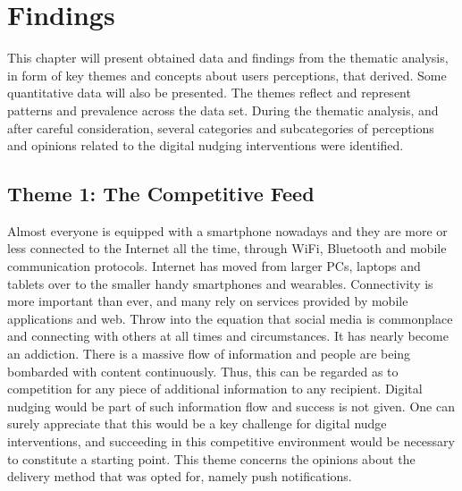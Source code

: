 \chapter{Findings}
This chapter will present obtained data and findings from the thematic analysis, in form of key themes and concepts about users perceptions, that derived. Some quantitative data will also be presented. The themes reflect and represent patterns and prevalence across the data set. During the thematic analysis, and after careful consideration, several categories and subcategories of perceptions and opinions related to the digital nudging interventions were identified. 

\section{Theme 1: The Competitive Feed}
 Almost everyone is equipped with a smartphone nowadays and they are more or less connected to the Internet all the time, through WiFi, Bluetooth and mobile communication protocols. Internet has moved from larger PCs, laptops and tablets over to the smaller handy smartphones and wearables. Connectivity is more important than ever, and many rely on services provided by mobile applications and web. Throw into the equation that social media is commonplace and connecting with others at all times and circumstances. It has nearly become an addiction. There is a massive flow of information and people are being bombarded with content continuously. Thus, this can be regarded as to competition for any piece of additional information to any recipient. Digital nudging would be part of such information flow and success is not given. One can surely appreciate that this would be a key challenge for digital nudge interventions, and succeeding in this competitive environment would be necessary to constitute a starting point. This theme concerns the opinions about the delivery method that was opted for, namely push notifications.

